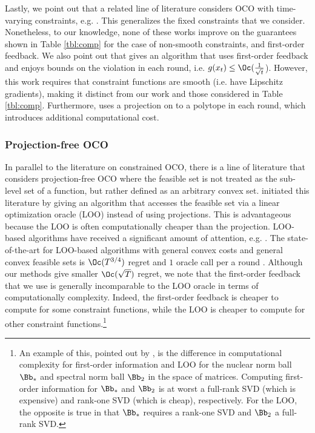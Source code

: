 Lastly, we point out that a related line of literature considers OCO with time-varying constraints, e.g. \citep{neely2017online,yu2017online,liakopoulos2019cautious,castiglioni2022unifying,guo2022online,kolev2023online}.
This generalizes the fixed constraints that we consider.
Nonetheless, to our knowledge, none of these works improve on the guarantees shown in Table \ref{tbl:comp} for the case of non-smooth constraints, and first-order feedback.
We also point out that \citet{kolev2023online} gives an algorithm that uses first-order feedback and enjoys bounds on the violation in each round, i.e. $g(x_t) \leq \Oc(\frac{1}{\sqrt{t}}$).
However, this work requires that constraint functions are smooth (i.e. have Lipschitz gradients), making it distinct from our work and those considered in Table \ref{tbl:comp}.
Furthermore, \citet{kolev2023online} uses a projection on to a polytope in each round, which introduces additional computational cost.

\subsubsection{Projection-free OCO}

In parallel to the literature on constrained OCO, there is a line of literature that considers projection-free OCO where the feasible set is not treated as the sub-level set of a function, but rather defined as an arbitrary convex set.
\citet{hazan2012projection} initiated this literature by giving an algorithm that accesses the feasible set via a linear optimization oracle (LOO) instead of using projections.
This is advantageous because the LOO is often computationally cheaper than the projection.
LOO-based algorithms have received a significant amount of attention, e.g. \citep{hazan2012projection,chen2019projection,garber2020improved,garber2022new,wang2024non,garberprojection}.
The state-of-the-art for LOO-based algorithms with general convex costs and general convex feasible sets is $\Oc(T^{3/4})$ regret and $1$ oracle call per a round \cite{hazan2012projection}.
Although our methods give smaller $\Oc(\sqrt{T})$ regret, we note that the first-order feedback that we use is generally incomparable to the LOO oracle in terms of computationally complexity.
Indeed, the first-order feedback is cheaper to compute for some constraint functions, while the LOO is cheaper to compute for other constraint functions.\footnote{An example of this, pointed out by \citet{garber2022new}, is the difference in computational complexity for first-order information and LOO for the nuclear norm ball $\Bb_*$ and spectral norm ball $\Bb_2$ in the space of matrices. Computing first-order information for $\Bb_*$ and $\Bb_2$ is at worst a full-rank SVD (which is expensive) and rank-one SVD (which is cheap), respectively. For the LOO, the opposite is true in that $\Bb_*$ requires a rank-one SVD and $\Bb_2$ a full-rank SVD.}

